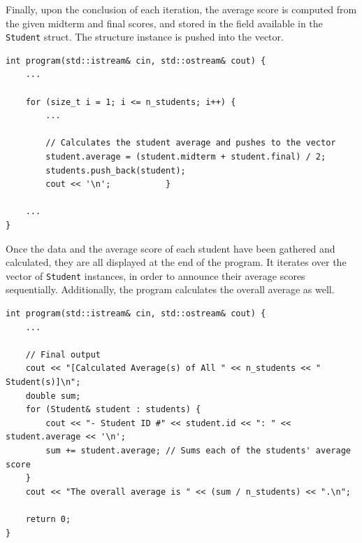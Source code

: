 \documentclass[12pt]{article}
\begin{document}
\pagebreak
Finally, upon the conclusion of each iteration, the average score is computed from the given midterm and final scores, and stored in the field available in the \texttt{Student} struct. The structure instance is pushed into the vector.

\begin{verbatim}
int program(std::istream& cin, std::ostream& cout) {
    ...

    for (size_t i = 1; i <= n_students; i++) {
        ...

        // Calculates the student average and pushes to the vector
        student.average = (student.midterm + student.final) / 2;
        students.push_back(student);
        cout << '\n';           }

    ...
}
\end{verbatim}

Once the data and the average score of each student have been gathered and calculated, they are all displayed at the end of the program. It iterates over the vector of \texttt{Student} instances, in order to announce their average scores sequentially. Additionally, the program calculates the overall average as well.

\begin{verbatim}
int program(std::istream& cin, std::ostream& cout) {
    ...

    // Final output
    cout << "[Calculated Average(s) of All " << n_students << " Student(s)]\n";
    double sum;
    for (Student& student : students) {
        cout << "- Student ID #" << student.id << ": " << student.average << '\n';
        sum += student.average; // Sums each of the students' average score
    }
    cout << "The overall average is " << (sum / n_students) << ".\n";

    return 0;
}
\end{verbatim}

\pagebreak
\end{document}
